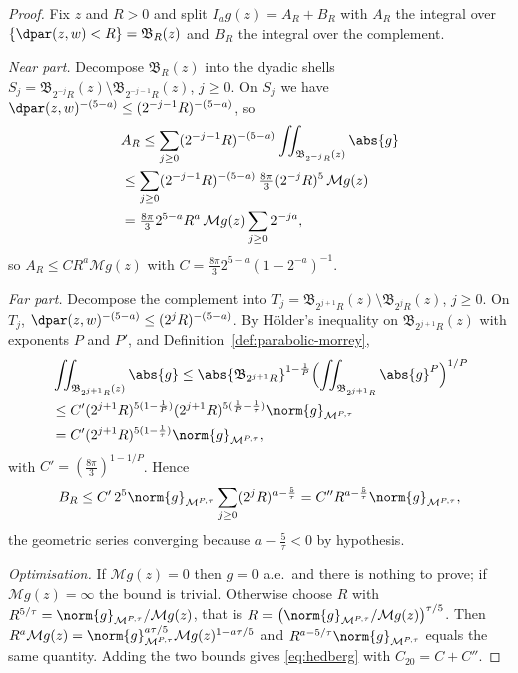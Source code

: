 \documentclass[11pt,reqno]{amsart}
\begin{document}
\begin{proof}
Fix $z$ and $R>0$ and split $I_{a}g(z)=A_{R}+B_{R}$ with $A_{R}$ the integral
over $\{\dpar(z,w)<R\}=\mathfrak{B}_{R}(z)$ and $B_{R}$ the integral over the
complement.

\emph{Near part.} Decompose $\mathfrak{B}_{R}(z)$ into the dyadic shells
$S_{j}=\mathfrak{B}_{2^{-j}R}(z)\setminus\mathfrak{B}_{2^{-j-1}R}(z)$,
$j\ge0$. On $S_{j}$ we have $\dpar(z,w)^{-(5-a)}\le(2^{-j-1}R)^{-(5-a)}$, so
\[\begin{aligned}
  &A_{R}\le\sum_{j\ge0}(2^{-j-1}R)^{-(5-a)}\iint_{\mathfrak{B}_{2^{-j}R}(z)}\abs{g}
  \\ &\le\sum_{j\ge0}(2^{-j-1}R)^{-(5-a)}\,\tfrac{8\pi}{3}(2^{-j}R)^{5}\,\mathcal{M}g(z)
  \\ &=\tfrac{8\pi}{3}2^{5-a}R^{a}\,\mathcal{M}g(z)\sum_{j\ge0}2^{-ja},
\end{aligned}\]
so $A_{R}\le C R^{a}\mathcal{M}g(z)$ with
$C=\tfrac{8\pi}{3}2^{5-a}(1-2^{-a})^{-1}$.

\emph{Far part.} Decompose the complement into
$T_{j}=\mathfrak{B}_{2^{j+1}R}(z)\setminus\mathfrak{B}_{2^{j}R}(z)$, $j\ge0$. On
$T_{j}$, $\dpar(z,w)^{-(5-a)}\le(2^{j}R)^{-(5-a)}$. By H\"older's inequality on
$\mathfrak{B}_{2^{j+1}R}(z)$ with exponents $P$ and $P'$, and
Definition~\ref{def:parabolic-morrey},
\[\begin{aligned}
  &\iint_{\mathfrak{B}_{2^{j+1}R}(z)}\abs{g}
  \le\abs{\mathfrak{B}_{2^{j+1}R}}^{1-\frac1P}
     \Bigl(\iint_{\mathfrak{B}_{2^{j+1}R}}\abs{g}^{P}\Bigr)^{1/P}
  \\ &\le C'(2^{j+1}R)^{5(1-\frac1P)}(2^{j+1}R)^{5(\frac1P-\frac1\tau)}
      \norm{g}_{\mathcal{M}^{P,\tau}}
  \\ &= C'(2^{j+1}R)^{5(1-\frac1\tau)}\norm{g}_{\mathcal{M}^{P,\tau}},
\end{aligned}\]
with $C'=(\tfrac{8\pi}{3})^{1-1/P}$. Hence
\[
  B_{R}\le C'\,2^{5}\norm{g}_{\mathcal{M}^{P,\tau}}
    \sum_{j\ge0}(2^{j}R)^{a-\frac5\tau}
  = C''R^{a-\frac5\tau}\norm{g}_{\mathcal{M}^{P,\tau}},
\]
the geometric series converging because $a-\tfrac5\tau<0$ by hypothesis.

\emph{Optimisation.} If $\mathcal{M}g(z)=0$ then $g=0$ a.e.\ and there is
nothing to prove; if $\mathcal{M}g(z)=\infty$ the bound is trivial. Otherwise
choose $R$ with
$R^{5/\tau}=\norm{g}_{\mathcal{M}^{P,\tau}}/\mathcal{M}g(z)$, that is
$R=\bigl(\norm{g}_{\mathcal{M}^{P,\tau}}/\mathcal{M}g(z)\bigr)^{\tau/5}$. Then
$R^{a}\mathcal{M}g(z)
 =\norm{g}_{\mathcal{M}^{P,\tau}}^{a\tau/5}\mathcal{M}g(z)^{1-a\tau/5}$ and
$R^{a-5/\tau}\norm{g}_{\mathcal{M}^{P,\tau}}$ equals the same quantity. Adding
the two bounds gives \eqref{eq:hedberg} with $C_{20}=C+C''$.
\end{proof}
\end{document}
